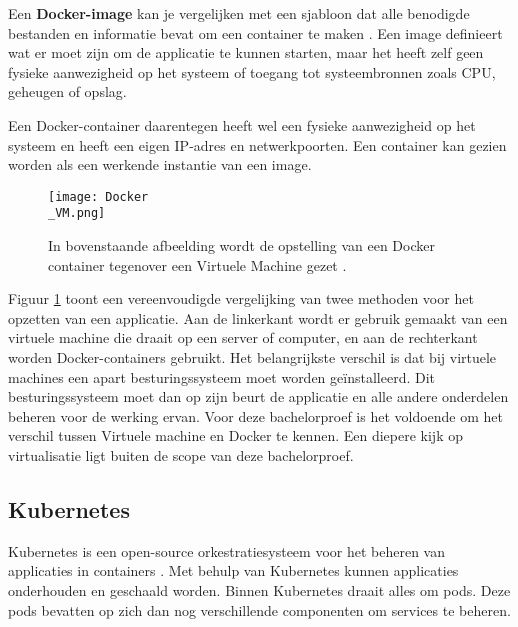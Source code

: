 Een \textbf{Docker-image} kan je vergelijken met een sjabloon dat alle benodigde bestanden en informatie bevat om een container te maken \autocite{Huang2018}. Een image definieert wat er moet zijn om de applicatie te kunnen starten, maar het heeft zelf geen fysieke aanwezigheid op het systeem of toegang tot systeembronnen zoals CPU, geheugen of opslag.

Een Docker-container daarentegen heeft wel een fysieke aanwezigheid op het systeem en heeft een eigen IP-adres en netwerkpoorten. Een container kan gezien worden als een werkende instantie van een image.

\begin{figure}[H]
	\centering
	\texttt{[image: Docker\\\_VM.png]}
	\caption[Voorstelling van Docker tegenover een Virtuele Machine]{\label{fig:Docker vs VM}In bovenstaande afbeelding wordt de opstelling van een Docker container tegenover een Virtuele Machine gezet \autocite{Kim2022}.}
\end{figure}

Figuur \ref{fig:Docker vs VM} toont een vereenvoudigde vergelijking van twee methoden voor het opzetten van een applicatie. Aan de linkerkant wordt er gebruik gemaakt van een virtuele machine die draait op een server of computer, en aan de rechterkant worden Docker-containers gebruikt. Het belangrijkste verschil is dat bij virtuele machines een apart besturingssysteem moet worden geïnstalleerd. Dit besturingssysteem moet dan op zijn beurt de applicatie en alle andere onderdelen beheren voor de werking ervan. Voor deze bachelorproef is het voldoende om het verschil tussen Virtuele machine en Docker te kennen. Een diepere kijk op virtualisatie ligt buiten de scope van deze bachelorproef.

\subsection{Kubernetes}

Kubernetes is een open-source orkestratiesysteem voor het beheren van applicaties in containers \autocite{Turin2023}. Met behulp van Kubernetes kunnen applicaties onderhouden en geschaald worden. Binnen Kubernetes draait alles om pods. Deze pods bevatten op zich dan nog verschillende componenten om services te beheren. 

